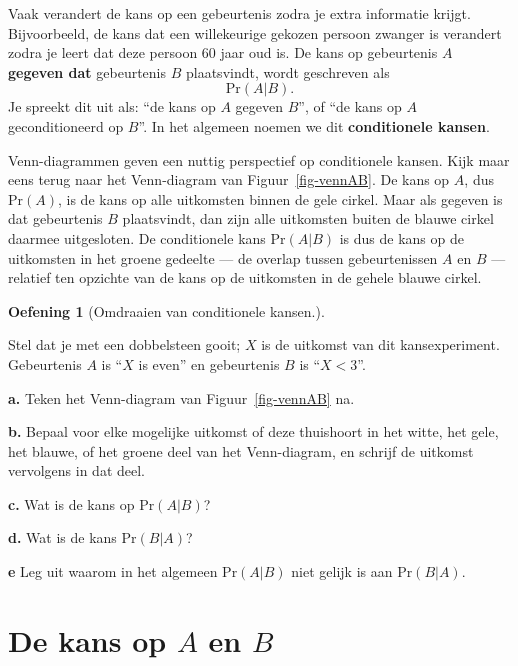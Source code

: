 \documentclass[
  a4paper,
]{scrbook}
\theoremstyle{definition}
\newtheorem{exercise}{Oefening}[chapter]
\theoremstyle{definition}
\theoremstyle{remark}
\begin{document}
Vaak verandert de kans op een gebeurtenis zodra je extra informatie
krijgt. Bijvoorbeeld, de kans dat een willekeurige gekozen persoon
zwanger is verandert zodra je leert dat deze persoon 60 jaar oud is. De
kans op gebeurtenis \(A\) \textbf{gegeven dat} gebeurtenis \(B\)
plaatsvindt, wordt geschreven als \[\textrm{Pr}\!\left(A | B\right).\]
Je spreekt dit uit als: ``de kans op \(A\) gegeven \(B\)'', of ``de kans
op \(A\) geconditioneerd op \(B\)''. In het algemeen noemen we dit
\textbf{conditionele kansen}.

Venn-diagrammen geven een nuttig perspectief op conditionele kansen.
Kijk maar eens terug naar het Venn-diagram van Figuur~\ref{fig-vennAB}.
De kans op \(A\), dus \(\textrm{Pr}\!\left(A\right)\), is de kans op
alle uitkomsten binnen de gele cirkel. Maar als gegeven is dat
gebeurtenis \(B\) plaatsvindt, dan zijn alle uitkomsten buiten de blauwe
cirkel daarmee uitgesloten. De conditionele kans
\(\textrm{Pr}\!\left(A | B\right)\) is dus de kans op de uitkomsten in
het groene gedeelte --- de overlap tussen gebeurtenissen \(A\) en \(B\)
--- relatief ten opzichte van de kans op de uitkomsten in de gehele
blauwe cirkel.

\begin{exercise}[Omdraaien van conditionele
kansen.]\protect\hypertarget{exr-omdraaien-bayes}{}\label{exr-omdraaien-bayes}

Stel dat je met een dobbelsteen gooit; \(X\) is de uitkomst van dit
kansexperiment. Gebeurtenis \(A\) is ``\(X\) is even'' en gebeurtenis
\(B\) is ``\(X < 3\)''.

\textbf{a.} Teken het Venn-diagram van Figuur~\ref{fig-vennAB} na.

\textbf{b.} Bepaal voor elke mogelijke uitkomst of deze thuishoort in
het witte, het gele, het blauwe, of het groene deel van het
Venn-diagram, en schrijf de uitkomst vervolgens in dat deel.

\textbf{c.} Wat is de kans op \(\textrm{Pr}\!\left(A|B\right)\)?

\textbf{d.} Wat is de kans \(\textrm{Pr}\!\left(B|A\right)\)?

\textbf{e} Leg uit waarom in het algemeen
\(\textrm{Pr}\!\left(A|B\right)\) niet gelijk is aan
\(\textrm{Pr}\!\left(B|A\right)\).

\end{exercise}

\section{\texorpdfstring{De kans op \(A\) en
\(B\)}{De kans op A en B}}\label{de-kans-op-a-en-b}
\end{document}
